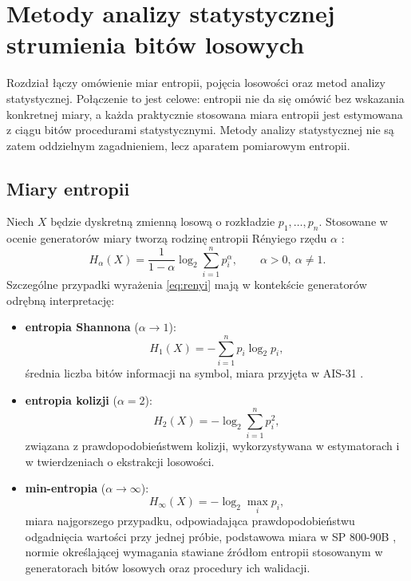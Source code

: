 \chapter{Metody analizy statystycznej strumienia bitów losowych}

Rozdział łączy omówienie miar entropii, pojęcia losowości oraz metod analizy
statystycznej. Połączenie to jest celowe: entropii nie da się omówić bez
wskazania konkretnej miary, a każda praktycznie stosowana miara entropii jest
estymowana z ciągu bitów procedurami statystycznymi. Metody analizy
statystycznej nie są zatem oddzielnym zagadnieniem, lecz aparatem pomiarowym
entropii.

\section{Miary entropii}

Niech $X$ będzie dyskretną zmienną losową o rozkładzie $p_1,\dots,p_n$.
Stosowane w ocenie generatorów miary tworzą rodzinę entropii Rényiego
rzędu $\alpha$ \cite{renyi1961}:
%
\begin{equation}
  H_\alpha(X) = \frac{1}{1-\alpha}\log_2\sum_{i=1}^{n} p_i^{\alpha},
  \qquad \alpha > 0,\ \alpha \neq 1 .
  \label{eq:renyi}
\end{equation}
%
Szczególne przypadki wyrażenia \eqref{eq:renyi} mają w kontekście generatorów
odrębną interpretację:

\begin{itemize}
  \item \textbf{entropia Shannona} ($\alpha \to 1$):
        \begin{equation}
          H_1(X) = -\sum_{i=1}^{n} p_i \log_2 p_i ,
          \label{eq:shannon}
        \end{equation}
        średnia liczba bitów informacji na symbol, miara przyjęta
        w AIS-31 \cite{killmann2011ais31}.
  \item \textbf{entropia kolizji} ($\alpha = 2$):
        \begin{equation}
          H_2(X) = -\log_2\sum_{i=1}^{n} p_i^2 ,
          \label{eq:kolizji}
        \end{equation}
        związana z prawdopodobieństwem kolizji, wykorzystywana
        w estymatorach i w twierdzeniach o ekstrakcji losowości.
  \item \textbf{min-entropia} ($\alpha \to \infty$):
        \begin{equation}
          H_\infty(X) = -\log_2 \max_{i} p_i ,
          \label{eq:minentropia}
        \end{equation}
        miara najgorszego przypadku, odpowiadająca prawdopodobieństwu
        odgadnięcia wartości przy jednej próbie, podstawowa miara
        w SP 800-90B \cite{turan2018sp80090b}, normie określającej wymagania stawiane źródłom entropii stosowanym w generatorach bitów losowych oraz procedury ich walidacji.
\end{itemize}


